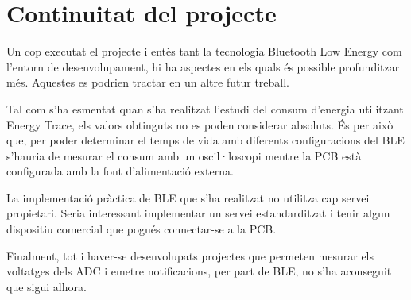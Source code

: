 \section{Continuitat del projecte}
Un cop executat el projecte i entès tant la tecnologia Bluetooth Low Energy com l'entorn de desenvolupament, hi ha aspectes en els quals és possible profunditzar més.
Aquestes es podrien tractar en un altre futur treball.

Tal com s'ha esmentat quan s'ha realitzat l'estudi del consum d'energia utilitzant Energy Trace, els valors obtinguts no es poden considerar absoluts.
És per això que, per poder determinar el temps de vida amb diferents configuracions del BLE s'hauria de mesurar el consum amb un oscil·loscopi mentre la PCB està configurada amb la font d'alimentació externa.

La implementació pràctica de BLE que s'ha realitzat no utilitza cap servei propietari.
Seria interessant implementar un servei estandarditzat i tenir algun dispositiu comercial que pogués connectar-se a la PCB.

Finalment, tot i haver-se desenvolupats projectes que permeten mesurar els voltatges dels ADC i emetre notificacions, per part de BLE, no s'ha aconseguit que sigui alhora.

